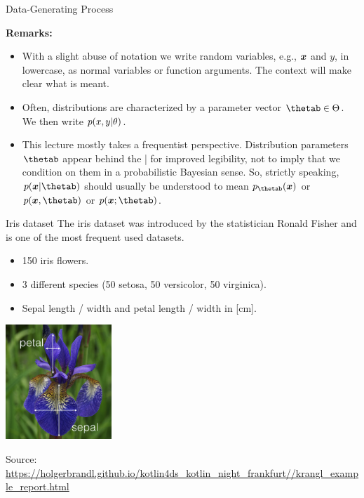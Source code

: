 \documentclass[11pt,compress,t,notes=noshow, xcolor=table]{beamer}
\begin{document}
\begin{vbframe}{Data-Generating Process}
\framebreak

\textbf{Remarks:}

\begin{itemize}

  \item With a slight abuse of notation we write random variables, e.g., $\bm{x}$ 
  and $y$, in lowercase, as normal variables or function arguments. The context 
  will make clear what is meant.
  
  \item Often, distributions are characterized by a parameter vector 
  $\thetab \in \Theta$. We then write $p(x, y | \theta)$.
  
  \item This lecture mostly takes a frequentist perspective. Distribution 
  parameters $\thetab$ appear behind the | for improved legibility, not to imply 
  that we condition on them in a probabilistic Bayesian sense.
  So, strictly speaking, $p(\xv | \thetab)$ should usually be understood to mean 
  $p_{\thetab}(\xv)$ or $p(\xv, \thetab)$ or $p(\xv; \thetab)$.

\end{itemize}

\end{vbframe}

\begin{vbframe}{Iris dataset}
The iris dataset was introduced by the statistician Ronald Fisher and is one
of the most frequent used datasets.
\begin{itemize}
\item 150 iris flowers.

\item 3 different species (50 setosa, 50 versicolor, 50 virginica).

\item Sepal length / width and petal length / width in [cm].
\end{itemize}

\begin{center}
\includegraphics[width=0.3\textwidth]{figure_man/iris_petal_sepal.png} 

\tiny
Source: \url{https://holgerbrandl.github.io/kotlin4ds_kotlin_night_frankfurt//krangl_example_report.html}
\normalsize
\end{center}
\end{vbframe}


\endlecture
\end{document}
